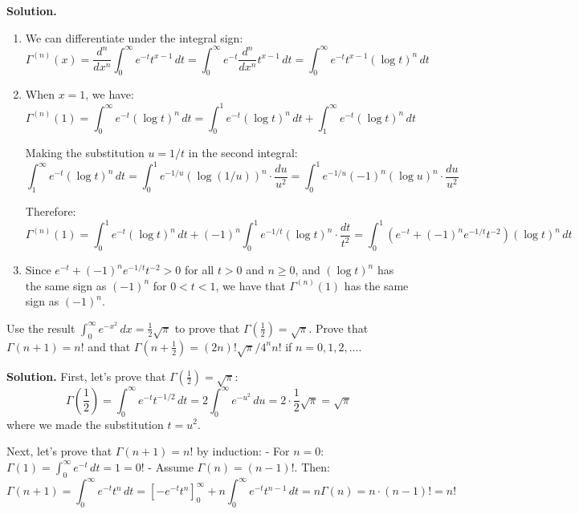 \noindent\textbf{Solution.}
\begin{enumerate}[label=(\alph*)]
    \item We can differentiate under the integral sign:
    \[\Gamma^{(n)}(x) = \frac{d^{n}}{dx^{n}} \int_{0}^{\infty} e^{-t} t^{x-1} \, dt = \int_{0}^{\infty} e^{-t} \frac{d^{n}}{dx^{n}} t^{x-1} \, dt = \int_{0}^{\infty} e^{-t} t^{x-1} (\log t)^{n} \, dt\]
    
    \item When $x = 1$, we have:
    \[\Gamma^{(n)}(1) = \int_{0}^{\infty} e^{-t} (\log t)^{n} \, dt = \int_{0}^{1} e^{-t} (\log t)^{n} \, dt + \int_{1}^{\infty} e^{-t} (\log t)^{n} \, dt\]
    
    Making the substitution $u = 1/t$ in the second integral:
    \[\int_{1}^{\infty} e^{-t} (\log t)^{n} \, dt = \int_{0}^{1} e^{-1/u} (\log(1/u))^{n} \cdot \frac{du}{u^{2}} = \int_{0}^{1} e^{-1/u} (-1)^{n} (\log u)^{n} \cdot \frac{du}{u^{2}}\]
    
    Therefore:
    \[\Gamma^{(n)}(1) = \int_{0}^{1} e^{-t} (\log t)^{n} \, dt + (-1)^{n} \int_{0}^{1} e^{-1/t} (\log t)^{n} \cdot \frac{dt}{t^{2}} = \int_{0}^{1} (e^{-t} + (-1)^{n} e^{-1/t} t^{-2}) (\log t)^{n} \, dt\]
    
    \item Since $e^{-t} + (-1)^{n} e^{-1/t} t^{-2} > 0$ for all $t > 0$ and $n \geq 0$, and $(\log t)^{n}$ has the same sign as $(-1)^{n}$ for $0 < t < 1$, we have that $\Gamma^{(n)}(1)$ has the same sign as $(-1)^{n}$.
\end{enumerate}

\begin{problembox}
Use the result $\int_{0}^{\infty} e^{-x^{2}} \, dx = \frac{1}{2} \sqrt{\pi}$ to prove that $\Gamma(\frac{1}{2}) = \sqrt{\pi}$. Prove that $\Gamma(n + 1) = n!$ and that $\Gamma(n + \frac{1}{2}) = (2n)! \sqrt{\pi}/4^{n}n!$ if $n = 0, 1, 2, \ldots$.
\end{problembox}

\noindent\textbf{Solution.}
First, let's prove that $\Gamma(\frac{1}{2}) = \sqrt{\pi}$:
\[\Gamma\left(\frac{1}{2}\right) = \int_{0}^{\infty} e^{-t} t^{-1/2} \, dt = 2 \int_{0}^{\infty} e^{-u^{2}} \, du = 2 \cdot \frac{1}{2} \sqrt{\pi} = \sqrt{\pi}\]
where we made the substitution $t = u^{2}$.

Next, let's prove that $\Gamma(n + 1) = n!$ by induction:
- For $n = 0$: $\Gamma(1) = \int_{0}^{\infty} e^{-t} \, dt = 1 = 0!$
- Assume $\Gamma(n) = (n-1)!$. Then:
\[\Gamma(n + 1) = \int_{0}^{\infty} e^{-t} t^{n} \, dt = \left[-e^{-t} t^{n}\right]_{0}^{\infty} + n \int_{0}^{\infty} e^{-t} t^{n-1} \, dt = n \Gamma(n) = n \cdot (n-1)! = n!\]

